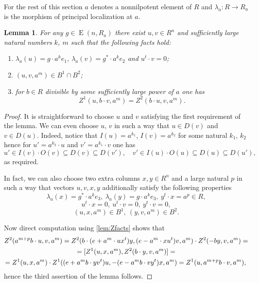 \documentclass[oneside,12pt]{amsart}
\numberwithin{equation}{section}
\newtheorem{lem}{Lemma}
\numberwithin{lem}{section}
\theoremstyle{definition}
\theoremstyle{remark}
\DeclareMathOperator{\EE}{E}
\begin{document}
\begin{appendices}
For the rest of this section $a$ denotes a nonnilpotent element of $R$ and $\lambda_a \colon R \rightarrow R_a$ is the morphism of principal localization at $a$.
\begin{lem} \label{lem:rk3rels} For any $g \in \EE(n, R_a)$ there exist $u, v \in R^n$ and sufficiently large natural numbers $k$, $m$ such that the following facts hold:
\begin{enumerate}
 \item $\lambda_a(u) = g \cdot a^k e_1$, $\lambda_a(v) = g^* \cdot a^k e_2$ and $u^t \cdot v = 0$;
 \item $(u, v, a^m) \in B^1 \cap B^2$;
 \item for $b \in R$ divisible by some sufficiently large power of $a$ one has
             $$Z^1(u, b \cdot v, a^m) = Z^2(b \cdot u, v, a^m).$$
\end{enumerate}
\end{lem}
\begin{proof}
It is straightforward to choose $u$ and $v$ satisfying the first requirement of the lemma.
We can even choose $u$, $v$ in such a way that $u \in D(v)$ and $v \in D(u)$.
Indeed, notice that $I(u) = a^{k_1}$, $I(v) = a^{k_2}$ for some natural $k_1$, $k_2$ hence for $u' = a^{k_2} \cdot u$ and $v' = a^{k_1} \cdot v$ one has
$$u' \in I(v) \cdot O(v) \subseteq D(v) \subseteq D(v'),\quad v' \in I(u) \cdot O(u) \subseteq D(u) \subseteq D(u'),$$
as required.

In fact, we can also choose two extra columns $x, y \in R^n$ and a large natural $p$ in such a way that vectors $u,v,x,y$ additionally satisfy the following properties
\begin{equation*} \lambda_a(x) = g^* \cdot a^k e_3,\ \lambda_a(y) = g \cdot a^k e_3,\ y^t \cdot x = a^p \in R, \end{equation*}
\begin{equation*} u^t \cdot x = 0,\ u^t \cdot v = 0,\ y^t \cdot v = 0, \end{equation*}
\begin{equation*} (u, x, a^m) \in B^1,\ (y, v, a^m) \in B^2. \end{equation*}

Now direct computation using \cref{lem:Zfacts} shows that
 \begin{multline*}
 Z^2(a^{m+p}b \cdot u, v, a^m) = Z^2(b \cdot (e+a^m \cdot ux^t)y, (e-a^m \cdot xu^t)v,a^m) \cdot Z^2(-by,v,a^m) = \\
  = [Z^1(u, x, a^m), Z^2(b \cdot y, v, a^m)] = \\
    = Z^1(u,x,a^m) \cdot Z^1((e+a^mb \cdot yv^t)u,-(e- a^mb \cdot vy^t)x,a^m) = Z^1(u,a^{m+p}b \cdot v,a^m), \qedhere
 \end{multline*}
hence the third assertion of the lemma follows.
\end{proof}


\end{appendices}
\end{document}
